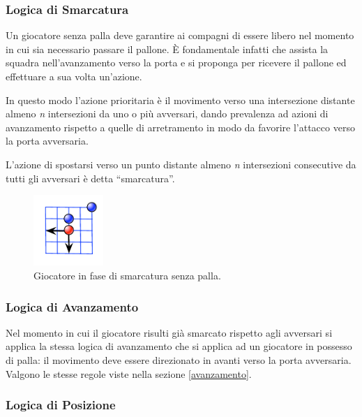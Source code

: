 \documentclass[aps,letterpaper,10pt]{article}
\begin{document}
\subsubsection{Logica di Smarcatura}

Un giocatore senza palla deve garantire ai compagni di essere libero nel momento in cui sia necessario passare il pallone. \`E fondamentale infatti che assista la squadra nell'avanzamento verso la porta e si proponga per ricevere il pallone ed effettuare a sua volta un'azione. \vspace{3mm}

In questo modo l'azione prioritaria \`e il movimento verso una intersezione distante almeno \emph{n} intersezioni da uno o pi\`u avversari, dando prevalenza ad azioni di avanzamento rispetto a quelle di arretramento in modo da favorire l'attacco verso la porta avversaria.

L'azione di spostarsi verso un punto distante almeno \emph{n} intersezioni consecutive da tutti gli avversari \`e detta ``smarcatura''.

\begin{figure}[H]
	\begin{center}
		\includegraphics[width=100px]{images/unmark.pdf}
	\end{center}
\caption{Giocatore in fase di smarcatura senza palla.}
\end{figure}

\subsubsection{Logica di Avanzamento}

Nel momento in cui il giocatore risulti gi\`a smarcato rispetto agli avversari si applica la stessa logica di avanzamento che si applica ad un giocatore in possesso di palla: il movimento deve essere direzionato in avanti verso la porta avversaria. Valgono le stesse regole viste nella sezione \ref{avanzamento}.

\subsubsection{Logica di Posizione}
\end{document}
